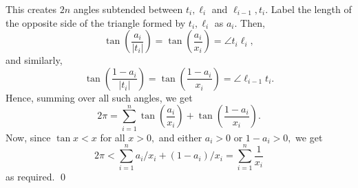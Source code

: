 \documentclass[12pt]{article}
\begin{document}
\begin{enumerate}
    This creates $2n$ angles subtended between $t_i, \ell_i$ and
    $\ell_{i - 1}, t_i.$ Label the length of the opposite side of the
    triangle formed by $t_i, \ell_i$ as $a_i.$ Then,
    $$
    \tan\left(\dfrac{a_i}{|t_i|}\right) =
    \tan\left(\dfrac{a_i}{x_i}\right) = \angle t_i\ell_i,
    $$
    and similarly,
    $$
    \tan\left(\dfrac{1 - a_i}{|t_i|}\right) = \tan\left(\dfrac{1 -
    a_i}{x_i}\right) = \angle \ell_{i-1} t_i.
    $$
    Hence, summing over all such angles, we get
    $$
    2\pi = \sum_{i = 1}^{n} \tan\left(\dfrac{a_i}{x_i}\right) +
    \tan\left(\dfrac{1-a_i}{x_i}\right).
    $$
    Now, since $\tan x < x$ for all $x > 0,$ and either $a_i >0$ or
    $1 - a_i > 0,$ we get
    $$
    2\pi < \sum_{i = 1} ^{n} a_i/x_i + (1-a_i)/ x_i = \sum_{i =
    1}^{n} \dfrac{1}{x_i}
    $$
    as required. \qed
\end{enumerate}
\end{document}
